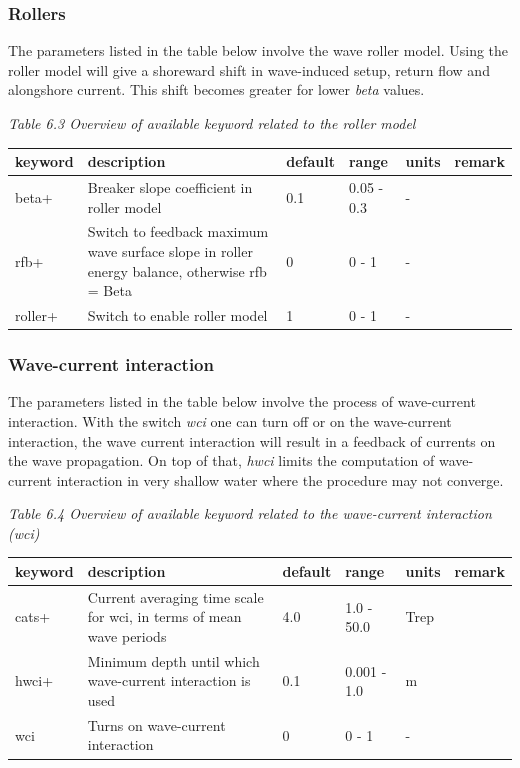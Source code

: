 \documentclass{article}
\begin{document}
\subsubsection{ Rollers}

\noindent The parameters listed in the table below involve the wave roller model. Using the roller model will give a shoreward shift in wave-induced setup, return flow and alongshore current. This shift becomes greater for lower \textit{beta} values.

\noindent \textit{Table 6.3 Overview of available keyword related to the roller model}

\begin{tabular}{|p{0.7in}|p{1.1in}|p{0.6in}|p{0.7in}|p{0.4in}|p{0.7in}|} \hline 
keyword & description & default & range & units & remark \\ \hline 
beta+ & Breaker slope coefficient in roller model & 0.1 & 0.05 - 0.3 & - &  \\ \hline 
rfb+ & Switch to feedback maximum wave surface slope in roller energy balance, otherwise rfb = Beta & 0 & 0 - 1 & - &  \\ \hline 
roller+ & Switch to enable roller model & 1 & 0 - 1 & - &  \\ \hline 
\end{tabular}


\subsubsection{ Wave-current interaction}

\noindent The parameters listed in the table below involve the process of wave-current interaction. With the switch \textit{wci} one can turn off or on the wave-current interaction, the wave current interaction will result in a feedback of currents on the wave propagation. On top of that, \textit{hwci} limits the computation of wave-current interaction in very shallow water where the procedure may not converge.

\noindent \textit{Table 6.4 Overview of available keyword related to the wave-current interaction (wci)}

\begin{tabular}{|p{0.7in}|p{1.1in}|p{0.6in}|p{0.7in}|p{0.4in}|p{0.7in}|} \hline 
keyword & description & default & range & units & remark \\ \hline 
cats+ & Current averaging time scale for wci, in terms of mean wave periods & 4.0 & 1.0 - 50.0 & Trep &  \\ \hline 
hwci+ & Minimum depth until which wave-current interaction is used & 0.1 & 0.001 - 1.0 & m &  \\ \hline 
wci & Turns on wave-current interaction & 0 & 0 - 1 & - &  \\ \hline 
\end{tabular}
\end{document}
